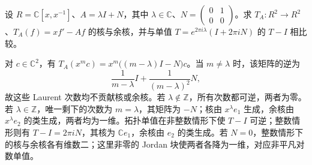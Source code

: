 \begin{exercise}
	设 \(R=\mathbb C[x,x^{-1}]\)、\(A=\lambda I+N\)，其中 \(\lambda\in\mathbb C\)、\(N=\begin{pmatrix}0&1\\0&0\end{pmatrix}\)。求 \(T_A:R^2\to R^2\)、\(T_A(f)=xf'-Af\) 的核与余核，并与单值 \(T=e^{2\pi i\lambda}(I+2\pi iN)\) 的 \(T-I\) 相比较。
\end{exercise}
\begin{solution}
	对 \(c\in\mathbb C^2\)，有 \(T_A(x^mc)=x^m\bigl((m-\lambda)I-N\bigr)c\)。当 \(m\ne\lambda\) 时，该矩阵的逆为
	\[
		\frac1{m-\lambda}I+\frac1{(m-\lambda)^2}N,
	\]
	故这些 Laurent 次数均不贡献核或余核。若 \(\lambda\notin\mathbb Z\)，所有次数都可逆，两者为零。若 \(\lambda\in\mathbb Z\)，唯一剩下的次数为 \(m=\lambda\)，其矩阵为 \(-N\)；核由 \(x^\lambda e_1\) 生成，余核由 \(x^\lambda e_2\) 的类生成，两者均为一维。拓扑单值在非整数情形下使 \(T-I\) 可逆；整数情形则有 \(T-I=2\pi iN\)，其核为 \(\mathbb Ce_1\)，余核由 \(e_2\) 的类生成。若 \(N=0\)，整数情形下的核与余核各有维数二；这里非零的 Jordan 块使两者各降为一维，对应非平凡对数单值。
\end{solution}
